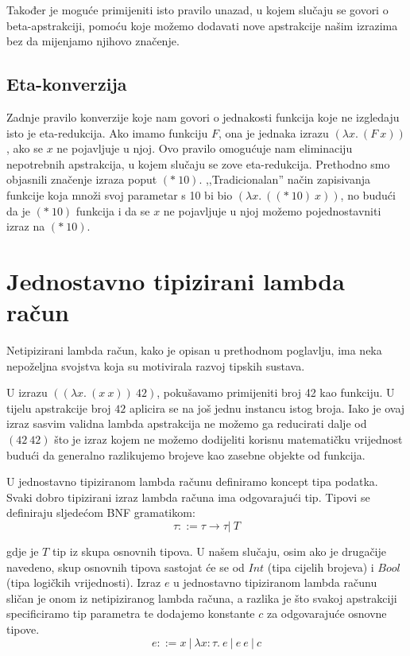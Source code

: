 \documentclass[diplomskirad,upload]{fer}
\begin{document}
Također je moguće primijeniti isto pravilo unazad, u kojem slučaju se govori o
beta-apstrakciji, pomoću koje možemo dodavati nove apstrakcije našim izrazima
bez da mijenjamo njihovo značenje.

\subsection{Eta-konverzija}

Zadnje pravilo konverzije koje nam govori o jednakosti funkcija koje ne izgledaju isto je
eta-redukcija. Ako imamo funkciju \(F\), ona je jednaka izrazu
\((\lambda x.\ (F\ x))\), ako se \(x\) ne pojavljuje u njoj. Ovo pravilo omogućuje
nam eliminaciju nepotrebnih apstrakcija, u kojem slučaju se zove eta-redukcija.
Prethodno smo objasnili značenje izraza poput \((*\ 10)\). ,,Tradicionalan''
način zapisivanja funkcije koja množi svoj parametar s 10 bi bio \((\lambda x.\
((*\ 10)\ x))\), no budući da je \((*\ 10)\) funkcija i da se \(x\) ne
pojavljuje u njoj možemo pojednostavniti izraz na \((*\ 10)\).

\section{Jednostavno tipizirani lambda račun}

Netipizirani lambda račun, kako je opisan u prethodnom poglavlju, ima neka
nepoželjna svojstva koja su motivirala razvoj tipskih sustava.

U izrazu \(((\lambda x.\ (x\ x))\ 42)\), pokušavamo primijeniti broj 42 kao
funkciju. U tijelu apstrakcije broj \(42\) aplicira se na još jednu instancu
istog broja. Iako je ovaj izraz sasvim validna lambda apstrakcija ne možemo ga
reducirati dalje od \((42\ 42)\) što je izraz kojem ne možemo dodijeliti
korisnu matematičku vrijednost budući da generalno razlikujemo brojeve kao
zasebne objekte od funkcija.

U jednostavno tipiziranom lambda računu  definiramo
koncept tipa podatka. Svaki dobro tipizirani \engl{well typed} izraz lambda računa ima
odgovarajući tip. Tipovi se definiraju sljedećom BNF gramatikom:
\[
    \tau ::= \tau \to \tau |\ T
\]

gdje je \(T\) tip iz skupa osnovnih tipova. U našem slučaju, osim ako je
drugačije navedeno, skup osnovnih tipova sastojat će se od \(Int\) (tipa cijelih
brojeva) i \(Bool\) (tipa logičkih vrijednosti). Izraz \(e\) u jednostavno
tipiziranom lambda računu sličan je onom iz netipiziranog lambda računa, a
razlika je što svakoj apstrakciji specificiramo tip parametra te dodajemo
konstante \(c\) za odgovarajuće osnovne tipove.
\[
    e ::= x\ |\ \lambda x : \tau .\ e\ |\ e\ e\ |\ c
\]
\end{document}
